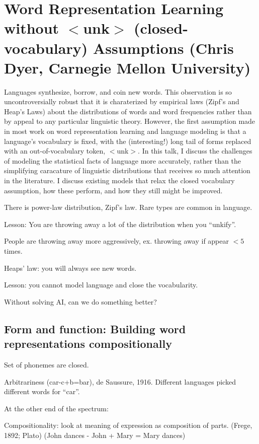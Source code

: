 \section{Word Representation Learning without $<$unk$>$ (closed-vocabulary) Assumptions (Chris Dyer, Carnegie Mellon University)}

Languages synthesize, borrow, and coin new words. This observation is so uncontroversially robust that it is charaterized by empirical laws (Zipf's and Heap's Laws) about the distributions of words and word frequencies rather than by appeal to any particular linguistic theory.  However, the first assumption made in most work on word representation learning and language modeling is that a language's vocabulary is fixed, with the (interesting!) long tail of forms replaced with an out-of-vocabulary token, $<$unk$>$. In this talk, I discuss the challenges of modeling the statistical facts of language more accurately, rather than the simplifying caracature of linguistic distributions that receives so much attention in the literature. I discuss existing models that relax the closed vocabulary assumption, how these perform, and how they still might be improved.

There is power-law distribution, Zipf's law. Rare types are common in language. 

Lesson: You are throwing away a lot of the distribution when you ``unkify''. 

People are throwing away more aggressively, ex. throwing away if appear $<5$ times.

Heaps' law: you will always see new words.

Lesson: you cannot model language and close the vocabularity.

Without solving AI, can we do something better?

\subsection{Form and function: Building word representations compositionally}


Set of phonemes are closed.

Arbitrariness (car-c+b=bar), de Saussure, 1916. Different languages picked different words for ``car''.

At the other end of the spectrum:

Compositionality: look at meaning of expression as composition of parts. (Frege, 1892; Plato)
(John dances  - John + Mary = Mary dances)

